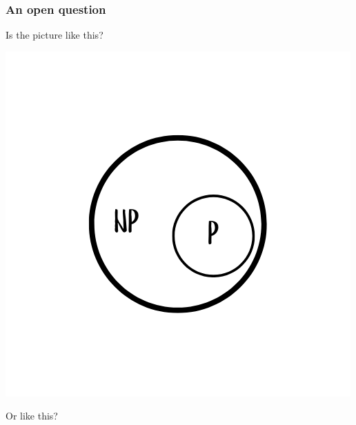 \begin{frame}
  \frametitle{An open question}

  \begin{minipage}{0.48\textwidth}
    \centering
    Is the picture like this?

    \vspace{0.3cm}

    \includegraphics[width=\linewidth]{figures/lec/np1.png} 
  \end{minipage}
  \hfill
  \begin{minipage}{0.48\textwidth}
    \centering
    Or like this?

    \vspace{0.3cm}


\end{minipage}
\end{frame}
